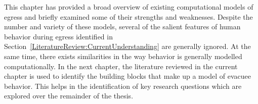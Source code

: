 
This chapter has provided a broad overview of existing computational models of egress and briefly examined some of their strengths and weaknesses. Despite the number and variety of these models, several of the salient features of human behavior during egress identified in Section~\ref{LiteratureReview:CurrentUnderstanding} are generally ignored. At the same time, there exists similarities in the way behavior is generally modelled computationally. In the next chapter, the literature reviewed in the current chapter is used to identify the building blocks that make up a model of evacuee behavior. This helps in the identification of key research questions which are explored over the remainder of the thesis.


